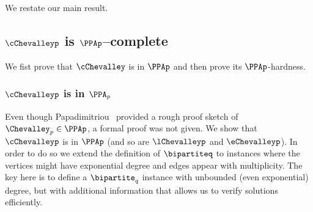 \noindent We restate our main result.

\completeness*

\subsection{\boldmath $\cChevalleyp$ is $\PPAp$--complete}
\label{sec:proofOfCombinedChevalley}

  We fist prove that $\cChevalley$ is in $\PPAp$ and then
prove its $\PPAp$-hardness.


\subsubsection{\boldmath $\cChevalleyp$ is in $\PPA_p$}

Even though Papadimitriou~\cite{r33} provided a rough proof sketch of $\Chevalley_p \in \PPAp$, a formal proof was not given. We show that $\cChevalleyp$ is in $\PPAp$ (and so are $\lChevalleyp$ and $\eChevalleyp$). In order to do so we extend the definition of $\bipartiteq$ to instances where the vertices might have exponential degree and edges appear with multiplicity. The key here is to define a $\bipartite_q$ instance with unbounded (even exponential) degree, but with additional information that allows us to verify solutions efficiently.\\[-1mm]


